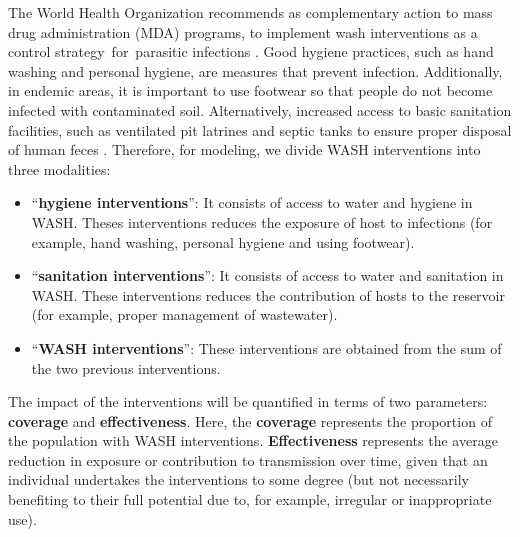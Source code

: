 \documentclass[12pt,a4paper]{article}
\theoremstyle{plain}%
\theoremstyle{definition}
\theoremstyle{remark}
\begin{document}
	The World Health Organization recommends as complementary action to mass drug administration (MDA) programs, to implement wash interventions as a control strategy for parasitic infections \citep{who2012soil}. Good hygiene practices, such as hand washing and personal hygiene, are measures that prevent infection. Additionally, in endemic areas, it is important to use footwear so that people do not become infected with contaminated soil. Alternatively, increased access to basic sanitation facilities, such as ventilated pit latrines and septic tanks to ensure proper disposal of human feces \citep{paho2003,who2012soil}. 
	Therefore, for modeling, we divide WASH interventions into three modalities:
	\begin{itemize}
		\item ``\textbf{hygiene interventions}'': It consists of access to water and hygiene in WASH.
		Theses interventions reduces the exposure of host to infections (for example, hand washing, personal hygiene and using footwear).
		\item  ``\textbf{sanitation interventions}'': It consists of access to water and sanitation in WASH.
		These interventions reduces the contribution of hosts to the reservoir (for example, proper management of wastewater).
		\item ``\textbf{WASH interventions}'': These interventions are obtained from the sum of the two previous interventions.
	\end{itemize}
	The impact of the interventions will be quantified in terms of two parameters: \textbf{coverage} and \textbf{effectiveness}. Here, the \textbf{coverage} represents the proportion of the population with WASH interventions. \textbf{Effectiveness} represents the average reduction in exposure or contribution to transmission over time, given that an individual undertakes the interventions to some degree (but not necessarily benefiting to their full potential due to, for example, irregular or inappropriate use)\citep{coffeng2018predicted}.
	
\end{document}

